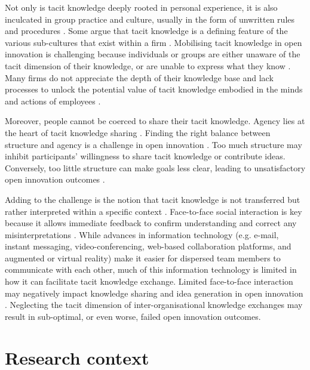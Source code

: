Not only is tacit knowledge deeply rooted in personal experience, it is also inculcated in group practice and culture, usually in the form of unwritten rules and procedures \citep{nonaka1995knowledge,howells1996tacit}. Some argue that tacit knowledge is a defining feature of the various sub-cultures that exist within a firm \citep[e.g.][]{smith2001role,munoz2015tacit}. Mobilising tacit knowledge in open innovation is challenging because individuals or groups are either unaware of the tacit dimension of their knowledge, or are unable to express what they know \citep{polanyi1966tacit}. Many firms do not appreciate the depth of their knowledge base and lack processes to unlock the potential value of tacit knowledge embodied in the minds and actions of employees \citep{nonaka1994dynamic,howells1996tacit,horvath2000working}. \medskip

Moreover, people cannot be coerced to share their tacit knowledge. Agency lies at the heart of tacit knowledge sharing \citep{polanyi1966tacit, emirbayer1994network}. Finding the right balance between structure and agency is a challenge in open innovation \citep{longo2017struggling}. Too much structure may inhibit participants' willingness to share tacit knowledge or contribute ideas. Conversely, too little structure can make goals less clear, leading to unsatisfactory open innovation outcomes \citep{davis2010agency,lam2014tacit}. \medskip

Adding to the challenge is the notion that tacit knowledge is not transferred but rather interpreted within a specific context \citep{nonaka1995knowledge,duguid2005art,marabelli2014knowing,zhang2020extended}. Face-to-face social interaction is key because it allows immediate feedback to confirm understanding and correct any misinterpretations \citep{haldin2000difficulties,gertler2003tacit,koskinen2003tacit}. While advances in information technology (e.g. e-mail, instant messaging, video-conferencing, web-based collaboration platforms, and augmented or virtual reality) make it easier for dispersed team members to communicate with each other, much of this information technology is limited in how it can facilitate tacit knowledge exchange. Limited face-to-face interaction may negatively impact knowledge sharing and idea generation in open innovation \citep{johannessen2001mismanagement}. Neglecting the tacit dimension of inter-organisational knowledge exchanges may result in sub-optimal, or even worse, failed open innovation outcomes. 

\section{Research context}

